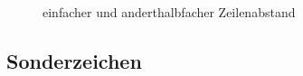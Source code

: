 \begin{frame}[fragile,t]
\begin{minipage}{\textwidth}
\begin{minipage}{.49\textwidth}
\begin{figure}[htp]
\vspace{-5pt}
\caption{einfacher und anderthalbfacher Zeilenabstand}
\end{figure}
\end{minipage}
\end{minipage}
\end{frame}




\subsection{Sonderzeichen}

